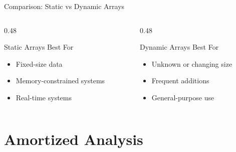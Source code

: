 \documentclass[aspectratio=169,xcolor=dvipsnames]{beamer}
\begin{document}
\begin{frame}{Comparison: Static vs Dynamic Arrays}
  \begin{columns}
    \begin{column}{0.48\textwidth}
      \begin{block}{Static Arrays Best For}
        \begin{itemize}
          \item Fixed-size data
          \item Memory-constrained systems
          \item Real-time systems
        \end{itemize}
      \end{block}
    \end{column}
    \begin{column}{0.48\textwidth}
      \begin{block}{Dynamic Arrays Best For}
        \begin{itemize}
          \item Unknown or changing size
          \item Frequent additions
          \item General-purpose use
        \end{itemize}
      \end{block}
    \end{column}
  \end{columns}
\end{frame}

\section{Amortized Analysis}
\end{document}
